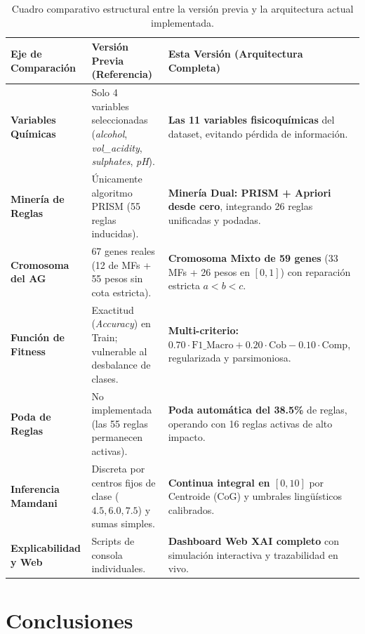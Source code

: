 \documentclass[11pt,a4paper]{article}
\begin{document}
\begin{table}[H]
\centering
\caption{Cuadro comparativo estructural entre la versión previa y la arquitectura actual implementada.}
\label{tab:comparativa_versiones}
\small
\begin{tabular}{p{4.2cm}p{5.2cm}p{5.5cm}}
\toprule
\textbf{Eje de Comparación} & \textbf{Versión Previa (Referencia)} & \textbf{Esta Versión (Arquitectura Completa)} \\
\midrule
\textbf{Variables Químicas} & Solo 4 variables seleccionadas (\textit{alcohol}, \textit{vol\_acidity}, \textit{sulphates}, \textit{pH}). & \textbf{Las 11 variables fisicoquímicas} del dataset, evitando pérdida de información. \\
\midrule
\textbf{Minería de Reglas} & Únicamente algoritmo PRISM (55 reglas inducidas). & \textbf{Minería Dual: PRISM + Apriori desde cero}, integrando 26 reglas unificadas y podadas. \\
\midrule
\textbf{Cromosoma del AG} & 67 genes reales (12 de MFs + 55 pesos sin cota estricta). & \textbf{Cromosoma Mixto de 59 genes} (33 MFs + 26 pesos en $[0, 1]$) con reparación estricta $a < b < c$. \\
\midrule
\textbf{Función de Fitness} & Exactitud (\textit{Accuracy}) en Train; vulnerable al desbalance de clases. & \textbf{Multi-criterio:} $0.70\cdot\text{F1\_Macro} + 0.20\cdot\text{Cob} - 0.10\cdot\text{Comp}$, regularizada y parsimoniosa. \\
\midrule
\textbf{Poda de Reglas} & No implementada (las 55 reglas permanecen activas). & \textbf{Poda automática del 38.5\%} de reglas, operando con 16 reglas activas de alto impacto. \\
\midrule
\textbf{Inferencia Mamdani} & Discreta por centros fijos de clase ($4.5, 6.0, 7.5$) y sumas simples. & \textbf{Continua integral en $[0, 10]$} por Centroide (CoG) y umbrales lingüísticos calibrados. \\
\midrule
\textbf{Explicabilidad y Web} & Scripts de consola individuales. & \textbf{Dashboard Web XAI completo} con simulación interactiva y trazabilidad en vivo. \\
\bottomrule
\end{tabular}
\end{table}

\section{Conclusiones}
\end{document}
